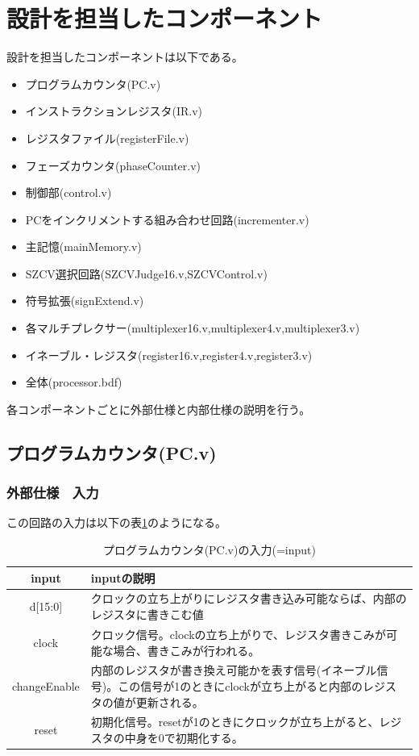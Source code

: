 \documentclass[a4j,titlepage]{jarticle}
\begin{document}
\section{設計を担当したコンポーネント}
設計を担当したコンポーネントは以下である。
\begin{itemize}
    \item プログラムカウンタ(PC.v)
    \item インストラクションレジスタ(IR.v)
    \item レジスタファイル(registerFile.v)
    \item フェーズカウンタ(phaseCounter.v)
    \item 制御部(control.v)
    \item PCをインクリメントする組み合わせ回路(incrementer.v)
    \item 主記憶(mainMemory.v)
    \item SZCV選択回路(SZCVJudge16.v,SZCVControl.v)
    \item 符号拡張(signExtend.v)
    \item 各マルチプレクサー(multiplexer16.v,multiplexer4.v,multiplexer3.v)
    \item イネーブル・レジスタ(register16.v,register4.v,register3.v)
    \item 全体(processor.bdf)
\end{itemize}
各コンポーネントごとに外部仕様と内部仕様の説明を行う。




\newpage
\subsection{プログラムカウンタ(PC.v)}

\subsubsection{外部仕様　入力}
この回路の入力は以下の表\ref{ProgramCounterI}のようになる。
\begin{table}[H]
    \caption{プログラムカウンタ(PC.v)の入力(=input)}
    \label{ProgramCounterI}
    \begin{center}
    \begin {tabularx}{150mm}{|c|X|} \hline
         input & inputの説明 \\ \hline \hline
	 d[15:0] & クロックの立ち上がりにレジスタ書き込み可能ならば、内部のレジスタに書きこむ値\\ \hline
     clock & クロック信号。clockの立ち上がりで、レジスタ書きこみが可能な場合、書きこみが行われる。\\ \hline %
     changeEnable & 内部のレジスタが書き換え可能かを表す信号(イネーブル信号)。この信号が1のときにclockが立ち上がると内部のレジスタの値が更新される。 \\ \hline
     reset & 初期化信号。resetが1のときにクロックが立ち上がると、レジスタの中身を0で初期化する。\\ \hline
    \end{tabularx}
    \end{center}
\end{table}
\end{document}
